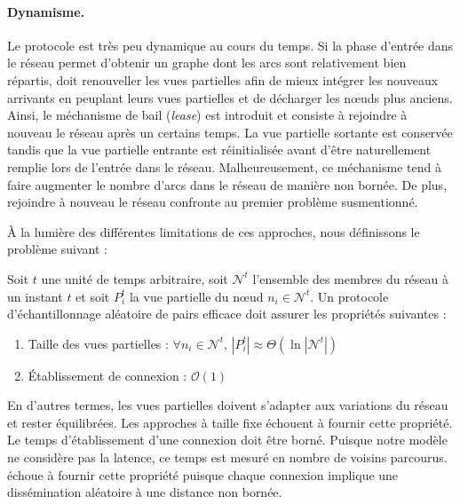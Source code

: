 \paragraph{Dynamisme.} Le protocole est très peu dynamique au cours du temps. Si
la phase d'entrée dans le réseau permet d'obtenir un graphe dont les arcs sont
relativement bien répartis, \SCAMP doit renouveller les vues partielles afin de
mieux intégrer les nouveaux arrivants en peuplant leurs vues partielles et de
décharger les nœuds plus anciens. Ainsi, le méchanisme de bail (\emph{lease})
est introduit et consiste à rejoindre à nouveau le réseau après un certains
temps. La vue partielle sortante est conservée tandis que la vue partielle
entrante est réinitialisée avant d'être naturellement remplie lors de l'entrée
dans le réseau. Malheureusement, ce méchanisme tend à faire augmenter le nombre
d'arcs dans le réseau de manière non bornée. De plus, rejoindre à nouveau le
réseau confronte au premier problème susmentionné.


À la lumière des différentes limitations de ces approches, nous définissons le
problème suivant :

\begin{problem}
  \label{net:problem:properties}
  Soit $t$ une unité de temps arbitraire, soit $\mathcal{N}^t$ l'ensemble des
  membres du réseau à un instant $t$ et soit $P_i^t$ la vue partielle du nœud
  $n_i \in \mathcal{N}^t$. Un protocole d'échantillonnage aléatoire de pairs
  efficace doit assurer les propriétés suivantes :
  \begin{enumerate}
  \item Taille des vues partielles : \hfill $\forall n_i \in \mathcal{N}^t$,
    $|P_i^t| \approx \Theta(\ln |\mathcal{N}^t|)$
  \item Établissement de connexion : \hfill $\mathcal{O}(1)$
  \end{enumerate}
\end{problem}
En d'autres termes, les vues partielles doivent s'adapter aux variations du
réseau et rester équilibrées. Les approches à taille fixe échouent à fournir
cette propriété. Le temps d'établissement d'une connexion doit être
borné. Puisque notre modèle ne considère pas la latence, ce temps est mesuré en
nombre de voisins parcourus. \SCAMP échoue à fournir cette propriété puisque
chaque connexion implique une dissémination aléatoire à une distance non bornée.

